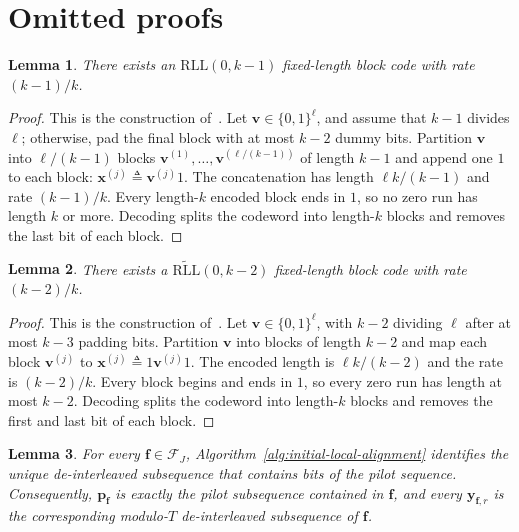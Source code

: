 \documentclass[journal,letterpaper,onecolumn,11pt]{IEEEtran}
\newcommand{\cF}{\mathcal{F}}
\newcommand{\boldf}{\mathbf{f}}
\newcommand{\boldp}{\mathbf{p}}
\newcommand{\boldv}{\mathbf{v}}
\newcommand{\boldx}{\mathbf{x}}
\newcommand{\boldy}{\mathbf{y}}
\newtheorem{lemma}{Lemma}
\begin{document}
\section{Omitted proofs}\label{appendix:rll-encoders}

\begin{lemma}
There exists an $\mathrm{RLL}(0,k-1)$ fixed-length block code with rate $(k-1)/k$.
\end{lemma}

\begin{proof}
This is the construction of~\cite[Lemma~1]{liu2026improved}. Let $\boldv\in\{0,1\}^{\ell}$, and assume that $k-1$ divides $\ell$; otherwise, pad the final block with at most $k-2$ dummy bits. Partition $\boldv$ into $\ell/(k-1)$ blocks $\boldv^{(1)},\ldots,\boldv^{(\ell/(k-1))}$ of length $k-1$ and append one $1$ to each block: $\boldx^{(j)}\triangleq\boldv^{(j)}1$. The concatenation has length $\ell k/(k-1)$ and rate $(k-1)/k$. Every length-$k$ encoded block ends in $1$, so no zero run has length $k$ or more. Decoding splits the codeword into length-$k$ blocks and removes the last bit of each block.
\end{proof}

\begin{lemma}
There exists a $\widetilde{\mathrm{RLL}}(0,k-2)$ fixed-length block code with rate $(k-2)/k$.
\end{lemma}

\begin{proof}
This is the construction of~\cite[Lemma~2]{liu2026improved}. Let $\boldv\in\{0,1\}^{\ell}$, with $k-2$ dividing $\ell$ after at most $k-3$ padding bits. Partition $\boldv$ into blocks of length $k-2$ and map each block $\boldv^{(j)}$ to $\boldx^{(j)}\triangleq1\boldv^{(j)}1$. The encoded length is $\ell k/(k-2)$ and the rate is $(k-2)/k$. Every block begins and ends in $1$, so every zero run has length at most $k-2$. Decoding splits the codeword into length-$k$ blocks and removes the first and last bit of each block.
\end{proof}
\begin{lemma}\label{lemma:initial-local-alignment-correct-appendix}
For every \(\boldf\in\cF_J\),
Algorithm~\ref{alg:initial-local-alignment} identifies the unique
de-interleaved subsequence that contains bits of the pilot sequence.
Consequently, \(\boldp_{\boldf}\) is exactly the pilot subsequence contained in \(\boldf\), and every \(\boldy_{\boldf,r}\) is the corresponding modulo-\(T\) de-interleaved subsequence of \(\boldf\).
\end{lemma}
\end{document}
